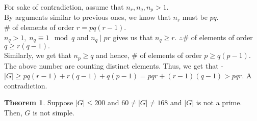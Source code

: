 \documentclass[12 pt, a4paper, toc=graduated, oneside]{article}
\theoremstyle{definition}
\newtheorem{theorem}{Theorem}
\begin{document}
\begin{enumerate}
	For sake of contradiction, assume that $n_r, n_q, n_p > 1.$\\
	By arguments similar to previous ones, we know that $n_r$ must be $pq.$\\
	$\#$ of elements of order $r = pq(r-1).$\\
	$n_q > 1, \; n_q \equiv 1 \mod q$ and $n_q \mid pr$ gives us that $n_q \ge r.$ 
	$\therefore \#$ of elements of order $q \ge r(q-1).$\\
	Similarly, we get that $n_p \ge q$ and hence, $\#$ of elements of order $p \ge q(p-1).$\\
	The above number are counting distinct elements. Thus, we get that -\\
	$|G| \ge pq(r-1) + r(q-1) + q(p-1) = pqr + (r-1)(q-1) > pqr.$ A contradiction. 
\end{enumerate}
\begin{theorem}
	Suppose $|G| \le 200$ and $60 \neq |G| \neq 168$ and $|G|$ is not a prime. Then, $G$ is not simple.
\end{theorem}
\end{document}
